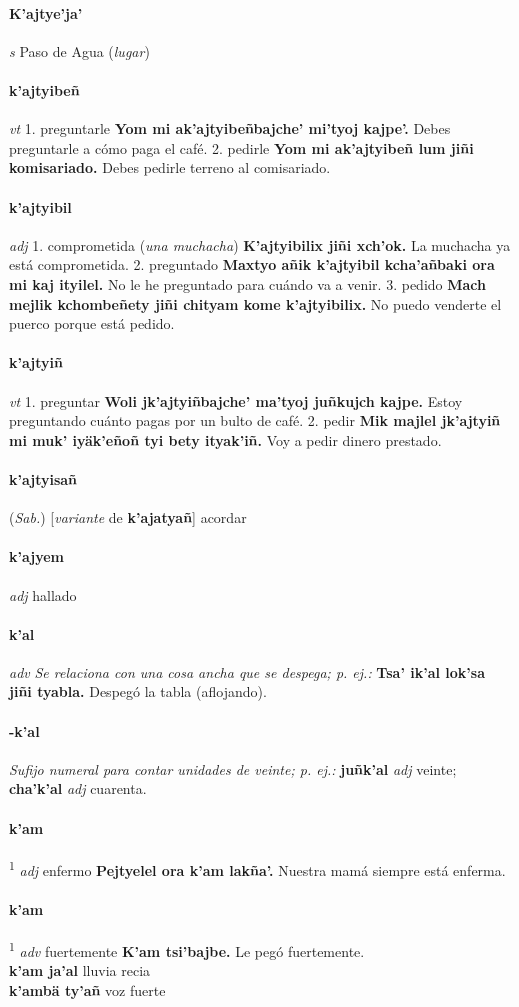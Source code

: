 \documentclass{scrbook}
\newcommand{\entry}[1]{\paragraph{#1}}
\newcommand{\onedefinition}[1]{#1.}
\newcommand{\defsuperscript}[1]{\textsuperscript{1}}
\newcommand{\nontranslationdef}[1]{\textit{#1}}
\newcommand{\partofspeech}[1]{\textit{#1}}
\newcommand{\spanishtranslation}[1]{#1}
\newcommand{\clarification}[1]{(\textit{#1})}
\newcommand{\cholexample}[1]{\textbf{#1}}
\newcommand{\exampletranslation}[1]{#1}
\newcommand{\relevantdialect}[1]{(\textit{#1})}
\newcommand{\secondaryentry}[1]{\\\textbf{#1}}
\newcommand{\secondtranslation}[1]{#1}
\newcommand{\conjugationtense}[1]{[\textit{#1}}
\newcommand{\conjugationverb}[1]{de \textbf{#1}]}
\begin{document}
\begin{multicols}{2}
\entry{K'ajtye'ja'}
\partofspeech{s}
\spanishtranslation{Paso de Agua}
\clarification{lugar}

\entry{k'ajtyibeñ}
\partofspeech{vt}
\onedefinition{1}
\spanishtranslation{preguntarle}
\cholexample{Yom mi ak'ajtyibeñbajche' mi'tyoj kajpe'.}
\exampletranslation{Debes preguntarle a cómo paga el café.}
\onedefinition{2}
\spanishtranslation{pedirle}
\cholexample{Yom mi ak'ajtyibeñ lum jiñi komisariado.}
\exampletranslation{Debes pedirle terreno al comisariado.}

\entry{k'ajtyibil}
\partofspeech{adj}
\onedefinition{1}
\spanishtranslation{comprometida}
\clarification{una muchacha}
\cholexample{K'ajtyibilix jiñi xch'ok.}
\exampletranslation{La muchacha ya está comprometida.}
\onedefinition{2}
\spanishtranslation{preguntado}
\cholexample{Maxtyo añik k'ajtyibil kcha'añbaki ora mi kaj ityilel.}
\exampletranslation{No le he preguntado para cuándo va a venir.}
\onedefinition{3}
\spanishtranslation{pedido}
\cholexample{Mach mejlik kchombeñety jiñi chityam kome k'ajtyibilix.}
\exampletranslation{No puedo venderte el puerco porque está pedido.}

\entry{k'ajtyiñ}
\partofspeech{vt}
\onedefinition{1}
\spanishtranslation{preguntar}
\cholexample{Woli jk'ajtyiñbajche' ma'tyoj juñkujch kajpe.}
\exampletranslation{Estoy preguntando cuánto pagas por un bulto de café.}
\onedefinition{2}
\spanishtranslation{pedir}
\cholexample{Mik majlel jk'ajtyiñ mi muk' iyäk'eñoñ tyi bety ityak'iñ.}
\exampletranslation{Voy a pedir dinero prestado.}

\entry{k'ajtyisañ}
\relevantdialect{Sab.}
\conjugationtense{variante}
\conjugationverb{k'ajatyañ}
\spanishtranslation{acordar}

\entry{k'ajyem}
\partofspeech{adj}
\spanishtranslation{hallado}

\entry{k'al}
\partofspeech{adv}
\nontranslationdef{Se relaciona con una cosa ancha que se despega; p. ej.:}
\cholexample{Tsa' ik'al lok'sa jiñi tyabla.}
\exampletranslation{Despegó la tabla (aflojando).}

\entry{-k'al}
\nontranslationdef{Sufijo numeral para contar unidades de veinte; p. ej.:}
\cholexample{juñk'al}
\partofspeech{adj}
\exampletranslation{veinte;}
\cholexample{cha'k'al}
\partofspeech{adj}
\exampletranslation{cuarenta.}

\entry{k'am}
\defsuperscript{1}
\partofspeech{adj}
\spanishtranslation{enfermo}
\cholexample{Pejtyelel ora k'am lakña'.}
\exampletranslation{Nuestra mamá siempre está enferma.}

\entry{k'am}
\defsuperscript{2}
\partofspeech{adv}
\spanishtranslation{fuertemente}
\cholexample{K'am tsi'bajbe.}
\exampletranslation{Le pegó fuertemente.}
\secondaryentry{k'am ja'al}
\secondtranslation{lluvia recia}
\secondaryentry{k'ambä ty'añ}
\secondtranslation{voz fuerte}


\end{multicols}
\end{document}
